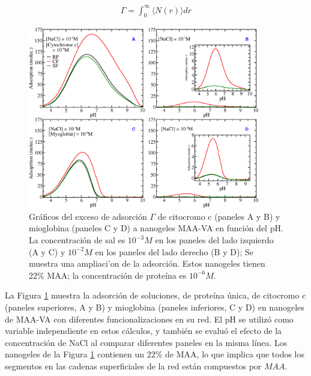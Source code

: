 %
\begin{align}
    \Gamma =  \int_0^\infty{  \langle N(r)\rangle dr}
\end{align}
%



\begin{figure}[!htb]
\includegraphics[width=0.9\textwidth]{Figures/graphs-gel2/abcd.png}
\caption{Gr\'aficos del exceso de adsorci\'on $\Gamma$ de citocromo c (paneles A y B) y mioglobina (paneles C y D) a nanogeles MAA-VA en funci\'on del pH.
	La concentraci\'on de sal es $10^{-3}M$ en los paneles del lado izquierdo (A y C) y $10^{-2}M$ en los paneles del lado derecho
	(B y D); Se muestra una ampliaci'on de la adsorci\'on.
	Estos nanogeles tienen 22\% MAA; la concentraci\'on de prote\'ina es $10^{-6}M$.}
\label{fig:esf:adsorption-vs-pH-cyto-myo}
\end{figure}
 
 La Figura \ref{fig:esf:adsorption-vs-pH-cyto-myo} muestra la adsorci\'on de soluciones, de prote\'ina \'unica, de citocromo c (paneles superiores, A y B) y mioglobina (paneles inferiores, C y D) en nanogeles de MAA-VA con diferentes funcionalizaciones en su red. El pH se utiliz\'o como variable independiente en estos c\'alculos, y tambi\'en se evalu\'o el efecto de la concentraci\'on de NaCl al comparar diferentes paneles en la misma l\'inea. Los nanogeles de la Figura \ref{fig:esf:adsorption-vs-pH-cyto-myo} contienen un $22\%$ de MAA, lo que implica que todos los segmentos en las cadenas superficiales de la red est\'an compuestos por $MAA$.
 
